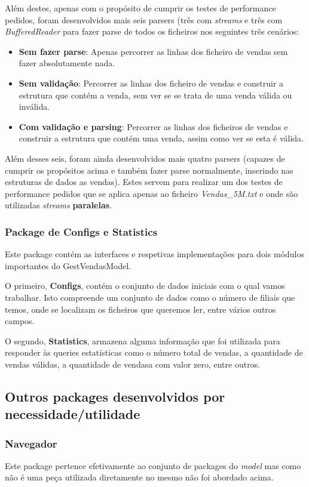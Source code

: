 \documentclass[11pt]{article}
\begin{document}
Além destes, apenas com o propósito de cumprir os testes de performance pedidos, foram desenvolvidos mais seis parsers (três com \textit{streams} e três com \textit{BufferedReader} para fazer parse de todos os ficheiros nos seguintes três cenários:
\begin{itemize}
    \item \textbf{Sem fazer parse}: Apenas percorrer as linhas dos ficheiro de vendas sem fazer absolutamente nada.
    \item \textbf{Sem validação}: Percorrer as linhas dos ficheiro de vendas e construir a estrutura que contém a venda, sem ver se se trata de uma venda válida ou inválida.
    \item \textbf{Com validação e parsing}: Percorrer as linhas dos ficheiros de vendas e construir a estrutura que contém uma venda, assim como ver se esta é válida.
\end{itemize}

Além desses seis, foram ainda desenvolvidos mais quatro parsers (capazes de cumprir os propósitos acima e também fazer parse normalmente, inserindo nas estruturas de dados as vendas). Estes servem para realizar um dos testes de performance pedidos que se aplica apenas ao ficheiro \textit{Vendas\_5M.txt} e onde são utilizadas \textit{streams} \textbf{paralelas}.

\subsubsection{Package de Configs e Statistics}
Este package contém as interfaces e respetivas implementações para dois módulos importantes do GestVendasModel.

O primeiro, \textbf{Configs}, contém o conjunto de dados iniciais com o qual vamos trabalhar. Isto compreende um conjunto de dados como o número de filiais que temos, onde se localizam os ficheiros que queremos ler, entre vários outros campos.

O segundo, \textbf{Statistics}, armazena alguma informação que foi utilizada para responder às queries estatísticas como o número total de vendas, a quantidade de vendas válidas, a quantidade de vendasa com valor zero, entre outros.
\newpage

\subsection{Outros packages desenvolvidos por necessidade/utilidade} 
\subsubsection{Navegador}
Este package pertence efetivamente ao conjunto de packages do \textit{model} mas como não é uma peça utilizada diretamente no mesmo não foi abordado acima.
\end{document}
